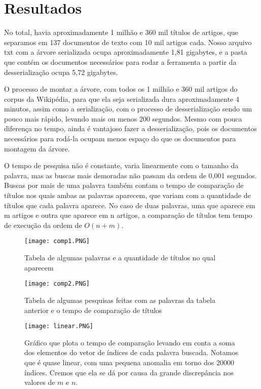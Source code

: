 \documentclass{article}
\begin{document}
\section{Resultados}

No total, havia aproximadamente 1 milhão e 360 mil títulos de artigos, que separamos em 137 documentos de texto com 10 mil artigos cada. Nosso arquivo txt com a árvore serializada ocupa aproximadamente 1,81 gigabytes, e a pasta que contém os documentos necessários para rodar a ferramenta a partir da desserialização ocupa 5,72 gigabytes.

O processo de montar a árvore, com todos os 1 milhão e 360 mil artigos do corpus da Wikipédia, para que ela seja serializada dura aproximadamente 4 minutos, assim como a serialização, com o processo de desserialização sendo um pouco mais rápido, levando mais ou menos 200 segundos. Mesmo com pouca diferença no tempo, ainda é vantajoso fazer a desserialização, pois os documentos necessários para rodá-la ocupam menos espaço do que os documentos para montagem da árvore.

O tempo de pesquisa não é constante, varia linearmente com o tamanho da palavra, mas as buscas mais demoradas não passam da ordem de 0,001 segundos. Buscas por mais de uma palavra também contam o tempo de comparação de títulos nos quais ambas as palavras aparecem, que variam com a quantidade de títulos que cada palavra aparece. No caso de duas palavras, uma que aparece em m artigos e outra que aparece em n artigos, a comparação de títulos tem tempo de execução da ordem de $O(n+m)$.

\begin{figure}[h!]
    \centering
    \texttt{[image: comp1.PNG]}
    \caption{Tabela de algumas palavras e a quantidade de títulos no qual aparecem}
    \label{fig:comp1}
\end{figure}

\begin{figure}[h!]
    \centering
    \texttt{[image: comp2.PNG]}
    \caption{Tabela de algumas pesquisas feitas com as palavras da tabela anterior e o tempo de comparação de títulos}
    \label{fig:comp2}
\end{figure}

\begin{figure}[h!]
    \centering
    \texttt{[image: linear.PNG]}
    \caption{Gráfico que plota o tempo de comparação levando em conta a soma dos elementos do vetor de índices de cada palavra buscada. Notamos que é quase linear, com uma pequena anomalia em torno dos 20000 índices. Cremos que ela se dá por causa da grande discrepância nos valores de $m$ e $n$.}
    \label{fig:grafico}
\end{figure}
\end{document}
